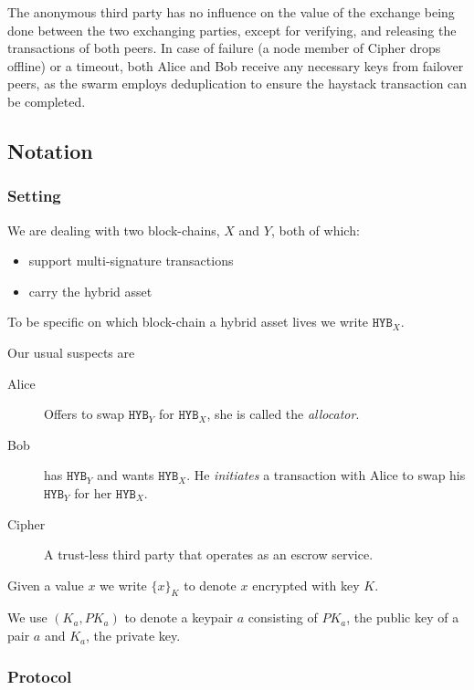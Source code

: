 \documentclass[a4paper,fullpack]{article}
\newcommand{\hyb}[1]{\ensuremath{\mathtt{ HYB }_{#1}}}
\newcommand{\crypt}[1]{\ensuremath{ {\lbrace {#1} \rbrace} } }
\begin{document}
The anonymous third party has no influence on the value of the exchange being done between the two exchanging parties, except for verifying, and releasing the transactions of both peers. In case of failure (a node member of Cipher drops offline) or a timeout, both Alice and Bob receive any necessary keys from failover peers, as the swarm employs deduplication to ensure the haystack transaction can be completed.

\subsection{Notation}

\subsubsection{Setting}

We are dealing with two block-chains, $X$ and $Y$, both of which:

\begin{itemize}
\item support multi-signature transactions
\item carry the hybrid asset
\end{itemize}

To be specific on which block-chain a hybrid asset lives we write \hyb{X}.

Our usual suspects are

\begin{description}
	\item[Alice] Offers to swap \hyb{Y} for \hyb{X}, she is called the \emph{allocator}.
	
	\item[Bob] has \hyb{Y} and wants \hyb{X}. He \emph{initiates} a transaction with Alice to swap his \hyb{Y} for her \hyb{X}.
	
	\item[Cipher] A trust-less third party that operates as an escrow service.
\end{description}

Given a value $x$ we write $\crypt{x}_K$ to denote $x$ encrypted with key $K$.

We use $(K_a, PK_a)$ to denote a keypair $a$ consisting of
$PK_a$, the public key of a pair $a$ and $K_a$, the private key.

\subsubsection{Protocol}
\end{document}
